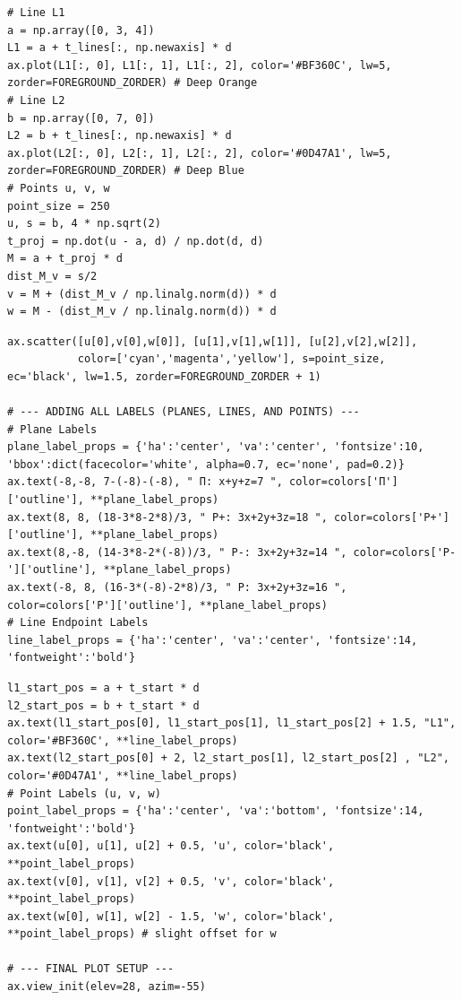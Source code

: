 \documentclass{beamer}
\theoremstyle{remark}
\numberwithin{equation}{section}
\begin{document}
\begin{frame}[fragile]
\begin{lstlisting}
# Line L1
a = np.array([0, 3, 4])
L1 = a + t_lines[:, np.newaxis] * d
ax.plot(L1[:, 0], L1[:, 1], L1[:, 2], color='#BF360C', lw=5, zorder=FOREGROUND_ZORDER) # Deep Orange
# Line L2
b = np.array([0, 7, 0])
L2 = b + t_lines[:, np.newaxis] * d
ax.plot(L2[:, 0], L2[:, 1], L2[:, 2], color='#0D47A1', lw=5, zorder=FOREGROUND_ZORDER) # Deep Blue
# Points u, v, w
point_size = 250
u, s = b, 4 * np.sqrt(2)
t_proj = np.dot(u - a, d) / np.dot(d, d)
M = a + t_proj * d
dist_M_v = s/2
v = M + (dist_M_v / np.linalg.norm(d)) * d
w = M - (dist_M_v / np.linalg.norm(d)) * d
\end{lstlisting}
\end{frame}
\begin{frame}[fragile]
\begin{lstlisting}
ax.scatter([u[0],v[0],w[0]], [u[1],v[1],w[1]], [u[2],v[2],w[2]],
           color=['cyan','magenta','yellow'], s=point_size, ec='black', lw=1.5, zorder=FOREGROUND_ZORDER + 1)

# --- ADDING ALL LABELS (PLANES, LINES, AND POINTS) ---
# Plane Labels
plane_label_props = {'ha':'center', 'va':'center', 'fontsize':10, 'bbox':dict(facecolor='white', alpha=0.7, ec='none', pad=0.2)}
ax.text(-8,-8, 7-(-8)-(-8), " Π: x+y+z=7 ", color=colors['Π']['outline'], **plane_label_props)
ax.text(8, 8, (18-3*8-2*8)/3, " P+: 3x+2y+3z=18 ", color=colors['P+']['outline'], **plane_label_props)
ax.text(8,-8, (14-3*8-2*(-8))/3, " P-: 3x+2y+3z=14 ", color=colors['P-']['outline'], **plane_label_props)
ax.text(-8, 8, (16-3*(-8)-2*8)/3, " P: 3x+2y+3z=16 ", color=colors['P']['outline'], **plane_label_props)
# Line Endpoint Labels
line_label_props = {'ha':'center', 'va':'center', 'fontsize':14, 'fontweight':'bold'}
\end{lstlisting}
\end{frame}
\begin{frame}[fragile]
\begin{lstlisting}
l1_start_pos = a + t_start * d
l2_start_pos = b + t_start * d
ax.text(l1_start_pos[0], l1_start_pos[1], l1_start_pos[2] + 1.5, "L1", color='#BF360C', **line_label_props)
ax.text(l2_start_pos[0] + 2, l2_start_pos[1], l2_start_pos[2] , "L2", color='#0D47A1', **line_label_props)
# Point Labels (u, v, w)
point_label_props = {'ha':'center', 'va':'bottom', 'fontsize':14, 'fontweight':'bold'}
ax.text(u[0], u[1], u[2] + 0.5, 'u', color='black', **point_label_props)
ax.text(v[0], v[1], v[2] + 0.5, 'v', color='black', **point_label_props)
ax.text(w[0], w[1], w[2] - 1.5, 'w', color='black', **point_label_props) # slight offset for w

# --- FINAL PLOT SETUP ---
ax.view_init(elev=28, azim=-55)
\end{lstlisting}
\end{frame}
\end{document}

